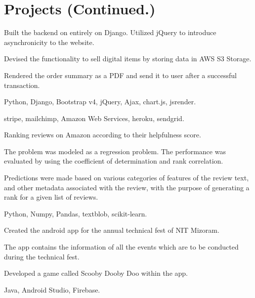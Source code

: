 \section{Projects \small{(Continued.)}}

 \vspace{0.1in}
\begin{tightemize}
\item Built the backend on entirely on Django. Utilized jQuery to introduce asynchronicity to the website.
\item Devised the functionality to sell digital items by storing data in AWS S3 Storage.
\item Rendered the order summary as a PDF and send it to user after a successful transaction.
\item {} Python, Django, Bootstrap v4, jQuery, Ajax, chart.js, jsrender.
\item {} stripe, mailchimp, Amazon Web Services, heroku, sendgrid.
\end{tightemize}
\sectionsep

\begin{tightemize}
\item Ranking reviews on Amazon according to their helpfulness score.
\item The problem was modeled as a regression problem. The performance was evaluated by using the coefficient of determination and rank correlation.
\item Predictions were made based on various categories of features of the review text, and other metadata associated with the review, with the purpose of generating a rank for a given list of reviews.
\item {} Python, Numpy, Pandas, textblob, scikit-learn.
\end{tightemize}
\sectionsep

\begin{tightemize}\item Created the android app for the annual technical fest of NIT Mizoram.
\item The app contains the information of all the events which are to be conducted during the technical fest.
\item Developed a game called Scooby Dooby Doo within the app.
\item {} Java, Android Studio, Firebase.
\end{tightemize}
\sectionsep